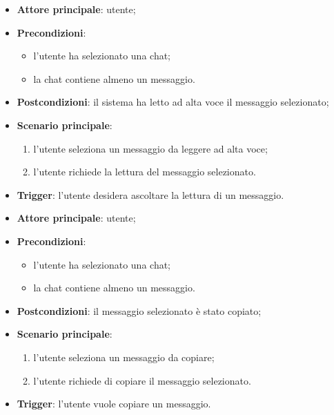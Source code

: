 \documentclass[10pt, a4paper]{article}
\begin{document}
    \begin{itemize}
        \item \textbf{Attore principale}: utente;
        \item \textbf{Precondizioni}: 
        \begin{itemize}
            \item l’utente ha selezionato una chat; 
            \item la chat contiene almeno un messaggio.
        \end{itemize}
        \item \textbf{Postcondizioni}: il sistema ha letto ad alta voce il messaggio selezionato;
        \item \textbf{Scenario principale}:
        \begin{enumerate}
            \item l’utente seleziona un messaggio da leggere ad alta voce;
            \item l’utente richiede la lettura del messaggio selezionato.
        \end{enumerate} 
        \item \textbf{Trigger}: l’utente desidera ascoltare la lettura di un messaggio.
    \end{itemize}

    \begin{itemize}
        \item \textbf{Attore principale}: utente;
        \item \textbf{Precondizioni}: 
        \begin{itemize}
            \item l’utente ha selezionato una chat; 
            \item la chat contiene almeno un messaggio.
        \end{itemize}
        \item \textbf{Postcondizioni}: il messaggio selezionato è stato copiato;
        \item \textbf{Scenario principale}:
        \begin{enumerate}
            \item l’utente seleziona un messaggio da copiare;
            \item l’utente richiede di copiare il messaggio selezionato.
        \end{enumerate}
        \item \textbf{Trigger}: l’utente vuole copiare un messaggio.
    \end{itemize}
\end{document}
